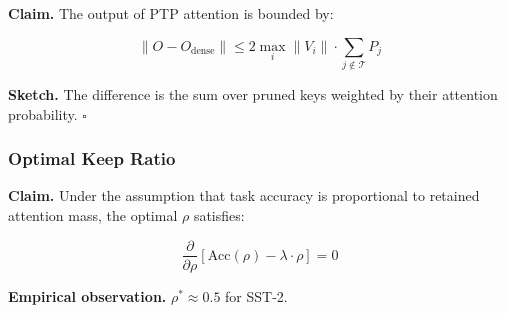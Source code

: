 \textbf{Claim.} The output of PTP attention is bounded by:

\[
\|O - O_\text{dense}\| \leq 2 \max_i \|V_i\| \cdot \sum_{j \notin \mathcal{T}} P_j
\tag{4.9}
\]

\textbf{Sketch.} The difference is the sum over pruned keys weighted by their 
attention probability. $\square$

\subsubsection{Optimal Keep Ratio}

\textbf{Claim.} Under the assumption that task accuracy is proportional to 
retained attention mass, the optimal $\rho$ satisfies:

\[
\frac{\partial}{\partial \rho} \left[\text{Acc}(\rho) - \lambda \cdot \rho\right] = 0
\tag{4.10}
\]

\textbf{Empirical observation.} $\rho^* \approx 0.5$ for SST-2.

